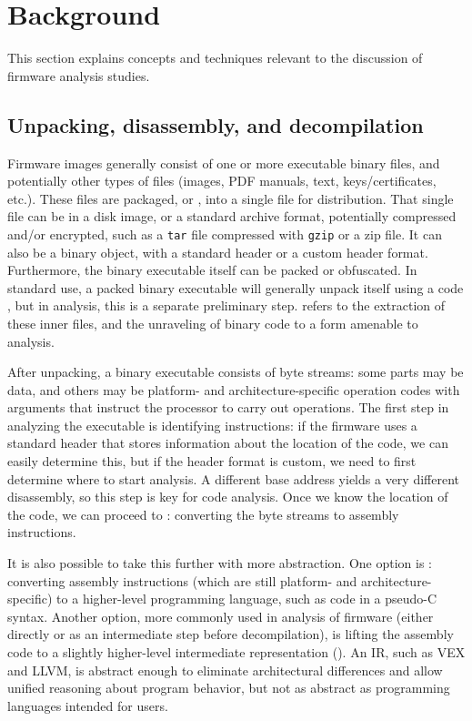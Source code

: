 \section{Background}\label{s:background}
This section explains concepts and techniques relevant to the discussion of firmware analysis studies.

\subsection{Unpacking, disassembly, and decompilation}
Firmware images generally consist of one or more executable binary files, and potentially other types of files (images, PDF manuals, text, keys/certificates, etc.).
These files are packaged, or , into a single file for distribution.
That single file can be in a disk image, or a standard archive format, potentially compressed and/or encrypted, such as a \texttt{tar} file compressed with \texttt{gzip} or a zip file.
It can also be a binary object, with a standard header or a custom header format.
Furthermore, the binary executable itself can be packed or obfuscated.
In standard use, a packed binary executable will generally unpack itself using a code , but in analysis, this is a separate preliminary step.
 refers to the extraction of these inner files, and the unraveling of binary code to a form amenable to analysis.

After unpacking, a binary executable consists of byte streams: some parts may be data, and others may be platform- and architecture-specific operation codes with arguments that instruct the processor to carry out operations.
The first step in analyzing the executable is identifying instructions: if the firmware uses a standard header that stores information about the location of the code, we can easily determine this, but if the header format is custom, we need to first determine where to start analysis.
A different base address yields a very different disassembly, so this step is key for code analysis.
Once we know the location of the code, we can proceed to : converting the byte streams to assembly instructions.

It is also possible to take this further with more abstraction.
One option is : converting assembly instructions (which are still platform- and architecture-specific) to a higher-level programming language, such as code in a pseudo-C syntax.
Another option, more commonly used in analysis of firmware (either directly or as an intermediate step before decompilation), is lifting the assembly code to a slightly higher-level intermediate representation ().
An IR, such as VEX and LLVM, is abstract enough to eliminate architectural differences and allow unified reasoning about program behavior, but not as abstract as programming languages intended for users.

